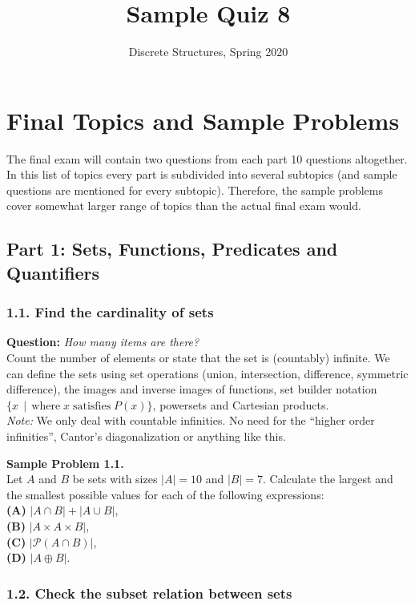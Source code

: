 \documentclass[jou]{apa6}
\title{Sample Quiz 8}
\author{Discrete Structures, Spring 2020}
\affiliation{RBS}
\begin{document}

\twocolumn
\section{Final Topics and Sample Problems}

The final exam will contain two questions from 
each part \textendash{} 10 questions altogether. 
In this list of topics every part is subdivided
into several subtopics (and sample questions 
are mentioned for every subtopic). 
Therefore, the sample problems cover somewhat
larger range of topics than the actual final exam would.

\subsection{Part 1: Sets, Functions, Predicates and Quantifiers}

\subsubsection{1.1. Find the cardinality of sets}

{\bf Question:} {\em How many items are there?}\\
{\scriptsize
Count the number of elements or state that the set is (countably) infinite. 
We can define the sets using set operations (union, intersection, difference, 
symmetric difference), the images and inverse images of functions, 
set builder notation $\{ x \,\mid\, \text{where}\;x\;\text{satisfies}\;P(x)\}$, 
powersets and Cartesian products.\\
{\em Note:} We only deal with countable infinities. 
No need for the ``higher order infinities'', 
Cantor’s diagonalization or anything like this.
}


\vspace{6pt}
{\bf Sample Problem 1.1.}\\
Let $A$ and $B$ be sets with sizes $|A| = 10$ and $|B| = 7$. Calculate 
the largest and the smallest possible values for each of the following expressions:\\
{\bf (A)} $|A \cap B| + |A \cup B|$,\\
{\bf (B)} $|A \times A \times B|$,\\
{\bf (C)} $\left| \mathcal{P}(A \cap B) \right|$,\\
{\bf (D)} $|A \oplus B|$.


\subsubsection{1.2. Check the subset relation between sets} 
\end{document}
